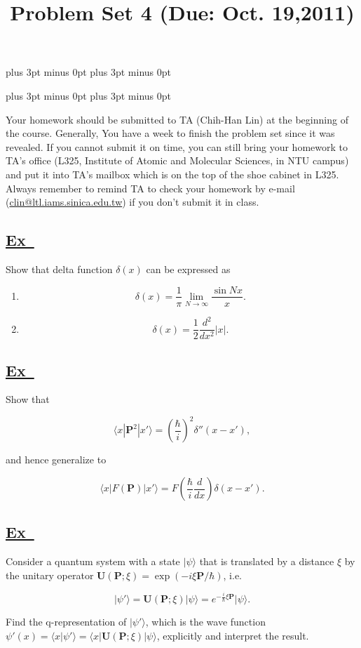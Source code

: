 \documentclass[a4paper,12pt]{article}
\newcommand{\excercise}{\addtocounter{section}{+1}
\subsection*{\underline{Ex~\thesection}}}
\newcommand{\bra}[1]{\langle#1|}
\newcommand{\ket}[1]{|#1\rangle }
\newcommand{\braket}[2]{\langle#1|#2\rangle }
\begin{document}
\abovedisplayskip=-6pt plus 3pt minus 0pt
\belowdisplayskip=8pt plus 3pt minus 0pt

\abovedisplayshortskip=-6pt plus 3pt minus 0pt
\belowdisplayshortskip=8pt plus 3pt minus 0pt

\title{Problem Set 4 (Due: Oct. 19,2011)}
\maketitle

Your homework should be submitted to TA (Chih-Han Lin) at the  beginning of the course. Generally, You have a week to finish the problem set since it was revealed. If you cannot submit it on time, you can still bring your homework to TA's office (L325, Institute of Atomic and Molecular Sciences, in NTU campus) and put it into TA's mailbox which is on the top of the shoe cabinet in L325. Always remember to remind TA to check your homework by e-mail (\url{clin@ltl.iams.sinica.edu.tw}) if you don't submit it in class.

%

\excercise
Show that delta function $\delta(x)$ can be expressed as

\begin{enumerate}
\item $$
\delta(x)=\frac{1}{\pi}\lim_{N\rightarrow \infty}\frac{\sin Nx}{x}.
$$

\item $$
\delta(x)=\frac{1}{2}\frac{d^2}{dx^2}|x|.
$$
 
\end{enumerate}


\excercise

Show that 

$$
\bra{x}\mathbf{P}^2\ket{x'}=\left(\frac{\hbar}{i}\right)^2\delta''(x-x'),
$$
 
\noindent and hence generalize to 

$$
\bra{x}F(\mathbf{P})\ket{x'}=F\left(\frac{\hbar}{i}\frac{d}{dx}\right)\delta(x-x').
$$



\excercise

Consider a quantum system with a state $\ket{\psi}$ that is translated by a distance $\xi$ by the unitary operator $\mathbf{U}(\mathbf{P}; \xi)=\exp(-i\xi\mathbf{P}/\hbar)$, i.e.

$$
\ket{\psi'}=\mathbf{U}(\mathbf{P}; \xi)\ket{\psi}=e^{-\frac{i}{\hbar}\xi\mathbf{P}}\ket{\psi}.
$$

Find the q-representation of $\ket{\psi'}$, which is the wave function $\psi'(x)=\braket{x}{\psi'}=\bra{x}\mathbf{U}(\mathbf{P}; \xi)\ket{\psi}$, explicitly and interpret the result.
\end{document}
